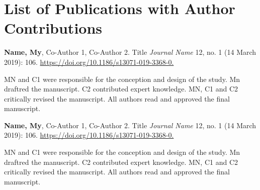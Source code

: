 \documentclass[%
a4paper,12pt,ngerman,UKenglish,twoside]{book}
\begin{document}
\chapter*{List of Publications with Author Contributions}

\begin{flushleft}
\textbf{Name, My}, Co-Author 1, Co-Author 2. Title \textit{Journal Name} 12, no. 1 (14 March 2019): 106. \url{https://doi.org/10.1186/s13071-019-3368-0.}
\par\medskip
{{MN}} and C1 were responsible for the conception and design of the study. Mn draftred the manuscript. C2 contributed expert knowledge. MN, C1 and C2 critically revised the manuscript. All authors read and approved the final manuscript.
\par\bigskip
\textbf{Name, My}, Co-Author 1, Co-Author 2. Title \textit{Journal Name} 12, no. 1 (14 March 2019): 106. \url{https://doi.org/10.1186/s13071-019-3368-0.}
\par\medskip
MN and C1 were responsible for the conception and design of the study. Mn draftred the manuscript. C2 contributed expert knowledge. MN, C1 and C2 critically revised the manuscript. All authors read and approved the final manuscript.
\end{flushleft}

\cleardoublepage


\mainmatter\setcounter{page}{1} %
 
\end{document}
